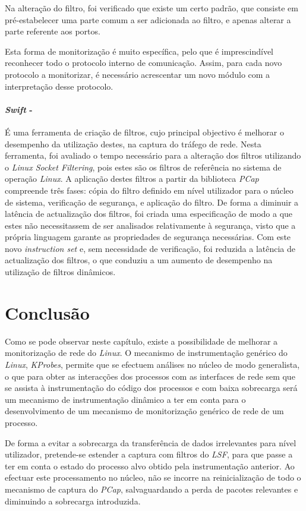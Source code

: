 Na alteração do filtro, foi verificado que existe um certo padrão, que consiste em pré-estabelecer uma parte comum a ser adicionada ao filtro, e apenas alterar a parte referente aos portos.

Esta forma de monitorização é muito específica, pelo que é imprescindível reconhecer todo o protocolo interno de comunicação.
Assim, para cada novo protocolo a monitorizar, é necessário acrescentar um novo módulo com a interpretação desse protocolo.

\paragraph*{\textit{Swift} - }
É uma ferramenta de criação de filtros, cujo principal objectivo é melhorar o desempenho da utilização destes, na captura do tráfego de rede.
Nesta ferramenta, foi avaliado o tempo necessário para a alteração dos filtros utilizando o \textit{Linux Socket Filtering}, pois estes são os filtros de referência no sistema de operação \textit{Linux}.
A aplicação destes filtros a partir da biblioteca \textit{PCap} compreende três fases: cópia do filtro definido em nível utilizador para o núcleo de sistema, verificação de segurança, e aplicação do filtro.
De forma a diminuir a latência de actualização dos filtros, foi criada uma especificação de modo a que estes não necessitassem de ser analisados relativamente à segurança, visto que a própria linguagem garante as propriedades de segurança necessárias.
Com este novo \textit{instruction set} e, sem necessidade de verificação, foi reduzida a latência de actualização dos filtros, o que conduziu a um aumento de desempenho na utilização de filtros dinâmicos.

\section{Conclusão}
\label{sec:segundo:conclusion}
Como se pode observar neste capítulo, existe a possibilidade de melhorar a monitorização de rede do \textit{Linux}.
O mecanismo de instrumentação genérico do \textit{Linux}, \textit{KProbes}, permite que se efectuem análises no núcleo de modo generalista, o que para obter as interacções dos processos com as interfaces de rede sem que se assista à instrumentação do código dos processos e com baixa sobrecarga será um mecanismo de instrumentação dinâmico a ter em conta para o desenvolvimento de um mecanismo de monitorização genérico de rede de um processo.

De forma a evitar a sobrecarga da transferência de dados irrelevantes para nível utilizador, pretende-se estender a captura com filtros do \textit{LSF}, para que passe a ter em conta o estado do processo alvo obtido pela instrumentação anterior.
Ao efectuar este processamento no núcleo, não se incorre na reinicialização de todo o mecanismo de captura do \textit{PCap}, salvaguardando a perda de pacotes relevantes e diminuindo a sobrecarga introduzida.
